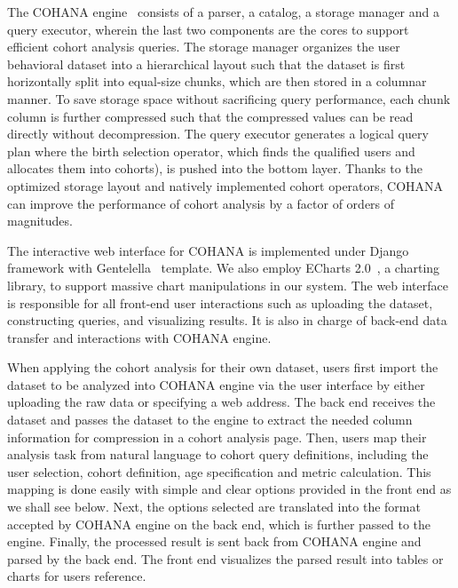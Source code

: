 The COHANA engine~\cite{jiang2016cohort} consists of a parser, a catalog, a storage manager and a query executor, wherein the last two components are the cores to support efficient cohort analysis queries. 
The storage manager organizes the user behavioral dataset into a hierarchical layout such that the dataset is first horizontally split into equal-size chunks, which are then stored in a columnar manner. To save storage space without sacrificing query performance, each chunk column is further compressed such that the compressed values can be read directly without decompression. The query executor generates a logical query plan where the birth selection operator, which finds the qualified users and allocates them into cohorts), is pushed into the bottom layer. Thanks to the optimized storage layout and natively implemented cohort operators, COHANA can improve the performance of cohort analysis by a factor of orders of magnitudes. 

The interactive web interface for COHANA is implemented under Django~\cite{django} framework with Gentelella~\cite{gentelella} template. We also employ ECharts 2.0~\cite{echarts}, a charting library, to support massive chart manipulations in our system. 
The web interface is responsible for all front-end user interactions such as uploading the dataset, constructing queries, and visualizing results. 
It is also in charge of back-end data transfer and interactions with COHANA engine. 

When applying the cohort analysis for their own dataset, users first import the dataset to be analyzed into COHANA engine via the user interface by either uploading the raw data or specifying a web address.
The back end receives the dataset and passes the dataset to the engine to extract the needed column information for compression in a cohort analysis page. 
Then, users map their analysis task from natural language to cohort query definitions, including the user selection, cohort definition, age specification and metric calculation.
This mapping is done easily with simple and clear options provided in the front end as we shall see below.
Next, the options selected are translated into the format accepted by COHANA engine on the back end, which is further passed to the engine. 
Finally, the processed result is sent back from COHANA engine and parsed by the back end. The front end visualizes the parsed result into tables or charts for users reference.

